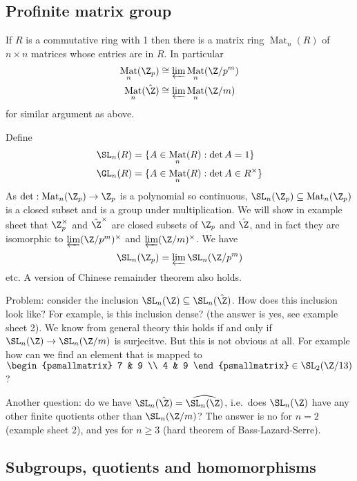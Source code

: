 \documentclass[a4paper]{article}
\DeclareMathOperator{\Mat}{Mat} %
\begin{document}
\subsection{Profinite matrix group}

If \(R\) is a commutative ring with 1 then there is a matrix ring \(\Mat_n(R)\) of \(n \times n\) matrices whose entries are in \(R\). In particular
\begin{align*}
  \Mat_n(\Z_p) &\cong \varprojlim \Mat_n(\Z/p^m) \\
  \Mat_n(\hat \Z) &\cong \varprojlim \Mat_n(\Z/m)
\end{align*}
for similar argument as above.

Define
\begin{align*}
  \SL_n(R) &= \{A \in \Mat_n(R): \det A = 1\} \\
  \GL_n(R) &= \{A \in \Mat_n(R): \det A \in R^\times\}
\end{align*}
As \(\det: \Mat_n(\Z_p) \to \Z_p\) is a polynomial so continuous, \(\SL_n(\Z_p) \subseteq \Mat_n(\Z_p)\) is a closed subset and is a group under multiplication. We will show in example sheet that \(\Z_p^\times\) and \(\hat \Z^\times\) are closed subsets of \(\Z_p\) and \(\hat \Z\), and in fact they are isomorphic to \(\varprojlim (\Z/p^m)^\times\) and \(\varprojlim (\Z/m)^\times\). We have
\[
  \SL_n(\Z_p) = \varprojlim \SL_n(\Z/p^m)
\]
etc. A version of Chinese remainder theorem also holds.

Problem: consider the inclusion \(\SL_n(\Z) \subseteq \SL_n(\hat \Z)\). How does this inclusion look like? For example, is this inclusion dense? (the answer is yes, see example sheet 2). We know from general theory this holds if and only if \(\SL_n(\Z) \to \SL_n(\Z/m)\) is surjecitve. But this is not obvious at all. For example how can we find an element that is mapped to \(
\begin{psmallmatrix}
  7 & 9 \\
  4 & 9
\end{psmallmatrix}
\in \SL_2(\Z/13)\)?

Another question: do we have \(\SL_n(\hat \Z) = \widehat{\SL_n(\Z)}\), i.e.\ does \(\SL_n(\Z)\) have any other finite quotients other than \(\SL_n(\Z/m)\)? The answer is no for  \(n = 2\) (example sheet 2), and yes for \(n \geq 3\) (hard theorem of Bass-Lazard-Serre).

\subsection{Subgroups, quotients and homomorphisms}
\end{document}

